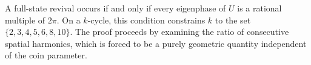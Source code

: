 A full-state revival occurs if and only if every eigenphase of $U$ is a
rational multiple of $2\pi$. On a $k$-cycle, this condition constrains
$k$ to the set $\{2, 3, 4, 5, 6, 8, 10\}$. The proof proceeds by
examining the ratio of consecutive spatial harmonics, which is forced
to be a purely geometric quantity independent of the coin parameter.
